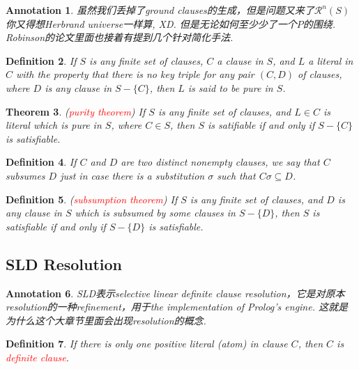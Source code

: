 \documentclass{article}
\theoremstyle{plain}
\newtheorem{theorem}{Theorem}
\newtheorem{definition}[theorem]{Definition}
\newtheorem{annotation}[theorem]{Annotation}
\newcounter{case}
\theoremstyle{nonumberplain}
\newcommand{\redt}[1]{\textcolor{red}{#1}}
\begin{document}

\begin{annotation}
\rm 虽然我们丢掉了ground clauses的生成，但是问题又来了$\mathcal{R}^n(S)$你又得想Herbrand universe一样算, XD. 但是无论如何至少少了一个$P$的围绕. Robinson的论文里面也接着有提到几个针对简化手法. 
\end{annotation}



\begin{definition}
\rm If $S$ is any finite set of clauses, $C$ a clause in $S$, and $L$ a literal in $C$ with the property that there is no key triple for any pair $(C,D)$ of clauses, where $D$ is any clause in $S-\{C\}$, then $L$ is said to be pure in $S$. 
\end{definition}

\begin{theorem}
\rm (\redt{purity theorem}) If $S$ is any finite set of clauses, and $L \in C$ is literal which is pure in $S$, where $C \in S$, then $S$ is satifiable if and only if $S - \{C\}$ is satisfiable. 
\end{theorem}

\begin{definition}
\rm If $C$ and $D$ are two distinct nonempty clauses, we say that $C$ subsumes $D$ just in case there is a substitution $\sigma$ such that $C\sigma \subseteq D$.
\end{definition}

\begin{definition}
\rm (\redt{subsumption theorem}) If $S$ is any finite set of clauses, and $D$ is any clause in $S$ which is subsumed by some clauses in $S - \{D\}$, then $S$ is satisfiable if and only if $S-\{D\}$ is satisfiable.
\end{definition}

\newpage
\subsection{SLD Resolution}

\begin{annotation}
\rm SLD表示selective linear definite clause resolution，它是对原本resolution的一种refinement，用于the implementation of Prolog's engine. 这就是为什么这个大章节里面会出现resolution的概念. 
\end{annotation}

\begin{definition}
\rm If there is only one positive literal (atom) in clause $C$, then $C$ is \redt{definite clause}. 
\end{definition}
\end{document}
